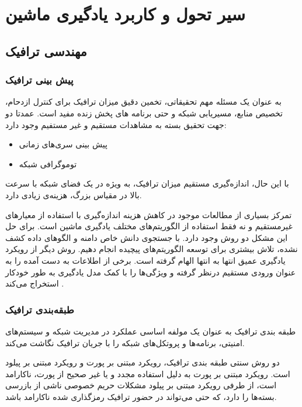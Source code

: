 \chapter{سیر تحول و کاربرد یادگیری ماشین}

\section{مهندسی ترافیک}
\subsection{پیش بینی ترافیک}

به عنوان یک مسئله مهم تحقیقاتی، تخمین دقیق میزان ترافیک برای کنترل ازدحام، تخصیص منابع، مسیریابی شبکه و حتی برنامه های پخش زنده مفید است. عمدتا دو جهت تحقیق بسته به مشاهدات مستقیم و غیر مستفیم وجود دارد:
\begin{itemize}
    \item پیش بینی سری‌های زمانی
    \item توموگرافی شبکه
    
\end{itemize}
با این حال، اندازه‌گیری مستقیم میزان ترافیک، به ویژه در یک فضای شبکه با سرعت بالا در مقیاس بزرگ، هزینه‌ی زیادی دارد.


تمرکز بسیاری از مطالعات موجود در کاهش هزینه اندازه‌گیری با استفاده از معیارهای غیرمستقیم و نه فقط استفاده از الگوریتم‌های مختلف یادگیری ماشین است. برای حل این مشکل دو روش وجود دارد.  با جستجوی دانش خاص دامنه و الگوهای داده کشف نشده، تلاش بیشتری برای توسعه الگوریتم‌های پیچیده انجام دهیم. روش دیگر از رویکرد یادگیری عمیق انتها به انتها الهام گرفته است. برخی از اطلاعات به دست آمده را به عنوان ورودی مستقیم درنظر گرفته و ویژگی‌ها را با کمک مدل یادگیری به طور خودکار استخراج می‌کند \cite{wang2017machine}.

\subsection{طبقه‌بندی ترافیک}

طبقه بندی ترافیک به عنوان یک مولفه اساسی عملکرد در مدیریت شبکه و سیستم‌های امنیتی، برنامه‌ها و پروتکل‌های شبکه را با جریان ترافیک نگاشت می‌کند. 

دو روش‌ سنتی طبقه بندی ترافیک، رویکرد مبتنی بر پورت و رویکرد مبتنی بر پیلود است. رویکرد مبتنی بر پورت به دلیل استفاده مجدد و یا غیر صحیح از پورت، ناکارامد است، از طرفی رویکرد مبتنی بر پیلود مشکلات حریم خصوصی ناشی از بازرسی بسته‌ها را دارد، که حتی می‌تواند در حضور ترافیک رمزگذاری شده ناکارامد باشد.

